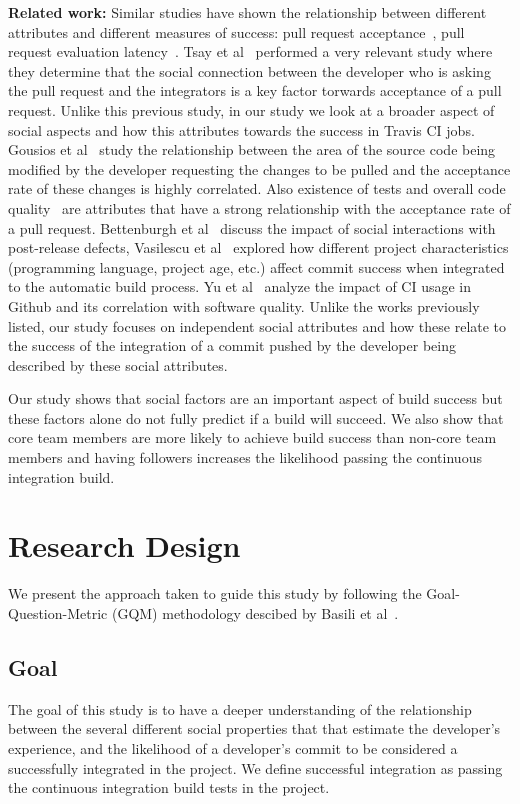 \documentclass[10pt, conference]{IEEEtran}
\begin{document}
\textbf{Related work:}
Similar studies have shown the relationship between different attributes and 
different measures of success: pull request acceptance~\cite{gousios14, 
gousios15,tsay14icse,tsay14fse}, pull request evaluation latency~\cite{Yu15}.
Tsay et al~\cite{tsay14icse} performed a very relevant study where they 
determine that the social connection between the developer who is asking the 
pull request and the integrators is a key factor torwards acceptance of a pull 
request. Unlike this previous study, in our study we look at a broader aspect of 
social aspects and how this attributes towards the success in Travis CI jobs. 
Gousios et al~\cite{gousios14} study the relationship between the area of the 
source code being modified by the developer requesting the changes to be pulled 
and the acceptance rate of these changes is highly correlated. Also existence of 
tests and overall code quality~\cite{gousios15} are attributes that have a 
strong relationship with the acceptance rate of a pull request. Bettenburgh et 
al~\cite{bettenburgh10} discuss the impact of social interactions with 
post-release defects, Vasilescu et al~\cite{vasilescu14} explored how different 
project characteristics (programming language, project age, etc.) affect commit 
success when integrated to the automatic build process. Yu et al~\cite{yu16} 
analyze the impact of CI usage in Github and its correlation with software 
quality. Unlike the works previously listed, our study focuses on independent social 
attributes and how these relate to the success of the integration of a commit 
pushed by the developer being described by these social attributes.

Our study shows that social factors are an important aspect of build success but
these factors alone do not fully predict if a build will succeed.  We also show
that core team members are more likely to achieve build success than non-core
team members and having followers increases the likelihood passing the
continuous integration build.

\section{Research Design}
We present the approach taken to guide this study by
following the Goal-Question-Metric (GQM) methodology descibed by Basili et 
al~\cite{Basili84}.

\subsection{Goal}
The goal of this study is to have a deeper understanding of the relationship 
between the several different social properties that that estimate the
developer's experience, and the likelihood of a developer's commit
to be considered a successfully integrated in the project. We define successful
integration as passing the continuous integration build tests in the project.
\end{document}

